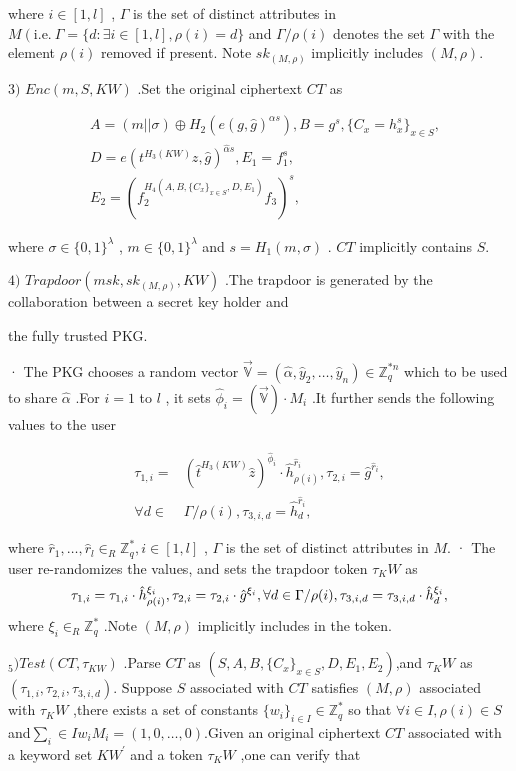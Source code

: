 \documentclass[runningheads]{llncs}
\begin{document}
where $i\in[1,l]$ , $\Gamma$ is the set of distinct attributes in $M\left(\mathrm{i.e.~}\Gamma=\{d:\exists i\in[1,l],\rho(i)=d\}\right.$ and $\Gamma/\rho(i)$
denotes the set $\Gamma$ with the element $\rho(i)$ removed if present. Note $sk_(M,\rho)$ implicitly includes $(M,\rho).$


$3) \textit{ Enc}( m, S, KW)$ .Set the original ciphertext $CT$ as

$$\begin{aligned}&A=(m||\sigma)\oplus H_2(e(g,\hat{g})^{\alpha s}),B=g^s,\{C_x=h_x^s\}_{x\in S},\\&D=e(t^{H_3(KW)}z,\hat{g})^{\hat{\alpha}s},E_1=f_1^s,\\&E_{2}=(f_2^{H_4(A,B,\{C_x\}_{x\in S},D,E_1)}f_3)^s,\end{aligned}$$

where $\sigma\in\{0,1\}^\lambda$ , $m\in\{0,1\}^\lambda$ and $s=H_1(m,\sigma)$ . $CT$ implicitly contains $S.$


$4) \textit{ Trapdoor}( msk, sk_{( M, \rho ) }, KW)$ .The trapdoor is generated by the collaboration between a secret key holder and

the fully trusted PKG.

· The PKG chooses a random vector $\vec{\mathbb{V}}=(\hat{\alpha},\hat{y}_2,\ldots,\hat{y}_n)\in\mathbb{Z}_q^{*n}$ which to be used to share $\hat{\alpha}$ .For $i=1$ to $l$ ,
it sets $\hat{\phi}_i=(\vec{\mathbb{V}})\cdot M_i$ .It further sends the following values to the user

$$\begin{aligned}\tau_{1,i}=&(\hat{t}^{H_3(KW)}\hat{z})^{\hat{\phi}_i}\cdot\hat{h}_{\rho(i)}^{\hat{r}_i},\tau_{2,i}=\hat{g}^{\hat{r}_i},\\\forall d\in&\Gamma/\rho(i),\tau_{3,i,d}=\hat{h}_d^{\hat{r}_i},\end{aligned}$$

where $\hat{r}_1,\ldots,\hat{r}_l\in_R\mathbb{Z}_q^*,i\in[1,l]$ , $\Gamma$ is the set of distinct attributes in $M.$
· The user re-randomizes the values, and sets the trapdoor token $\tau_KW$ as
$$\tau_{1,i}=\tau_{1,i}\cdot\hat{h}_{\rho(i)}^{\xi_i},\tau_{2,i}=\tau_{2,i}\cdot\hat{g}^{\xi_i},\\\forall d\in\Gamma/\rho(i),\tau_{3,i,d}=\tau_{3,i,d}\cdot\hat{h}_d^{\xi_i},$$
where $\xi_i\in_R\mathbb{Z}_q^*$ .Note $(M,\rho)$ implicitly includes in the token.

$_{5})Test(CT,\tau_{KW})$ .Parse $CT$ as $(S,A,B,\{C_x\}_{x\in S},D,E_1,E_2)$,and $\tau_KW$ as $(\tau_{1,i},\tau_{2,i},\tau_{3,i,d}).$ Suppose $S$
associated with $CT$ satisfies $(M,\rho)$ associated with $\tau_KW$ ,there exists a set of constants $\{w_i\}_{i\in I}\in\mathbb{Z}_q^*$ so that $\forall i\in I,\rho(i)\in S$ and$\sum_i\in Iw_iM_i=\left(1,0,\ldots,0\right)$.Given an original ciphertext $CT$ associated with a keyword set $KW^{\prime}$ and a token $\tau_KW$ ,one can verify that
\end{document}
